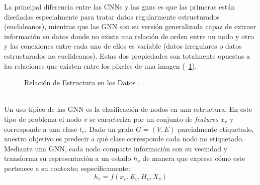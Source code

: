	La principal diferencia entre las CNNs y las \acp{gnn} es que las primeras están diseñadas especialmente para tratar datos regularmente estructurados (euclideanos), mientras que las GNN son su versión generalizada capaz de extraer información en datos donde no existe una relación de orden entre un nodo y otro y las conexiones entre cada uno de ellos es variable (datos irregulares o datos estructurados no euclideanos). Estas dos propiedades son totalmente opuestas a las relaciones que existen entre los píxeles de una imagen (\figurename~\ref{euclidian-non}).
	\begin{figure}[!thb]
		\centering
		 \hspace{10mm}
		\caption[Relación de Estructura en los Datos]{Relación de Estructura en los Datos \citep{Wu_2021}.}
		\label{euclidian-non}
	\end{figure}
	\\
	Un uso típico de las GNN es la clasificación de nodos en una estructura. En este tipo de problema el nodo $v$ se caracteriza por un conjunto de \textit{features} $x_v$ y corresponde a una clase $t_v$. Dado un grafo $G = (V, E)$ parcialmente etiquetado, nuestro objetivo es predecir a qué clase corresponde cada nodo no etiquetado. Mediante una GNN, cada nodo comparte información con su vecindad y transforma su representación a un estado $h_v$ de manera que exprese cómo este pertenece a su contexto; específicamente:
	\begin{equation}
		h_v = f(x_v, E_v, H_v, X_v)
	\end{equation}

